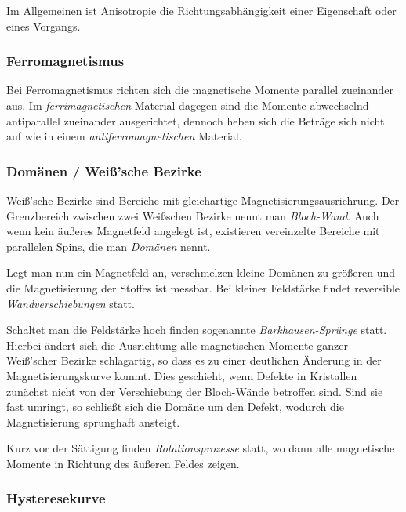 \documentclass[12pt,a4paper]{scrartcl}
\numberwithin{equation}{section} %
\renewcommand{\[}{} %
\renewcommand{\]}{\noindent} %
\begin{document}
Im Allgemeinen ist Anisotropie die Richtungsabhängigkeit einer
Eigenschaft oder eines Vorgangs.

\hypertarget{ferromagnetismus}{%
\subsubsection{Ferromagnetismus}\label{ferromagnetismus}}

Bei Ferromagnetismus richten sich die magnetische Momente parallel
zueinander aus. Im \emph{ferrimagnetischen} Material dagegen sind die
Momente abwechselnd antiparallel zueinander ausgerichtet, dennoch heben
sich die Beträge sich nicht auf wie in einem
\emph{antiferromagnetischen} Material.

\hypertarget{domuxe4nen-weiuxdfsche-bezirke}{%
\subsubsection{Domänen / Weiß'sche
Bezirke}\label{domuxe4nen-weiuxdfsche-bezirke}}

Weiß'sche Bezirke sind Bereiche mit gleichartige
Magnetisierungsausrichrung. Der Grenzbereich zwischen zwei Weißschen
Bezirke nennt man \emph{Bloch-Wand}. Auch wenn kein äußeres Magnetfeld
angelegt ist, existieren vereinzelte Bereiche mit parallelen Spins, die
man \emph{Domänen} nennt.

Legt man nun ein Magnetfeld an, verschmelzen kleine Domänen zu größeren
und die Magnetisierung der Stoffes ist messbar. Bei kleiner Feldstärke
findet reversible \emph{Wandverschiebungen} statt.

Schaltet man die Feldstärke hoch finden sogenannte
\emph{Barkhausen-Sprünge} statt. Hierbei ändert sich die Ausrichtung
alle magnetischen Momente ganzer Weiß'scher Bezirke schlagartig, so dass
es zu einer deutlichen Änderung in der Magnetisierungskurve kommt. Dies
geschieht, wenn Defekte in Kristallen zunächst nicht von der
Verschiebung der Bloch-Wände betroffen sind. Sind sie fast umringt, so
schließt sich die Domäne um den Defekt, wodurch die Magnetisierung
sprunghaft ansteigt.

Kurz vor der Sättigung finden \emph{Rotationsprozesse} statt, wo dann
alle magnetische Momente in Richtung des äußeren Feldes zeigen.

\hypertarget{hysteresekurve}{%
\subsubsection{Hysteresekurve}\label{hysteresekurve}}
\end{document}
